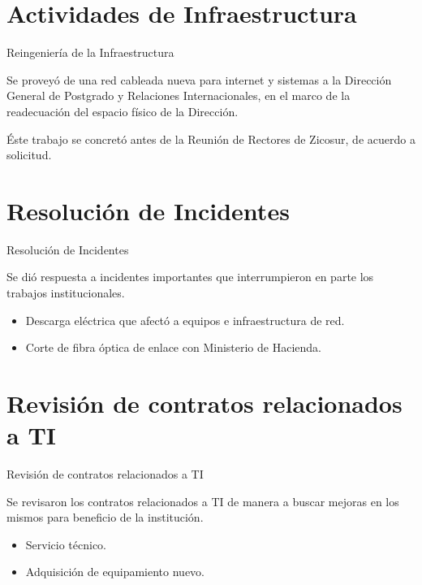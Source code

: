 \documentclass[usenames,dvipsnames]{beamer}
\begin{document}
\section{Actividades de Infraestructura}
\begin{frame}{Reingeniería de la Infraestructura}

Se proveyó de una red cableada nueva para internet y sistemas a la Dirección General de Postgrado y Relaciones Internacionales, en el marco de la readecuación del espacio físico de la Dirección.\vspace{10pt}
             	
Éste trabajo se concretó antes de la Reunión de Rectores de Zicosur, de acuerdo a solicitud.

\end{frame}

\section{Resolución de Incidentes}
\begin{frame}{Resolución de Incidentes}

Se dió respuesta a incidentes importantes que interrumpieron en parte los trabajos institucionales.\vspace{10pt}
             	
    \begin{itemize}
		\item Descarga eléctrica que afectó a equipos e infraestructura de red.
		\item Corte de fibra óptica de enlace con Ministerio de Hacienda.
	\end{itemize}


\end{frame}


\section{Revisión de contratos relacionados a TI}
\begin{frame}{Revisión de contratos relacionados a TI}

Se revisaron los contratos relacionados a TI de manera a buscar mejoras en los mismos para beneficio de la institución.\vspace{10pt}
             	
    \begin{itemize}
		\item Servicio técnico.
		\item Adquisición de equipamiento nuevo.
	\end{itemize}


\end{frame}
\end{document}

